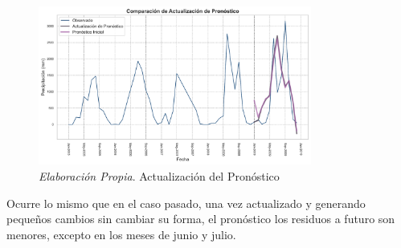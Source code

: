 \documentclass[12pt,letterpaper]{article}   %
\begin{document}
\begin{figure}[ht]
    \centering
    \includegraphics[width=0.8\textwidth]{imagenes/06-02-Actualizacion-de-pronostico.pdf}
    \caption{\textit{Elaboración Propia}. Actualización del Pronóstico}
\end{figure}

Ocurre lo mismo que en el caso pasado, una vez actualizado y generando pequeños cambios sin cambiar su forma, el pronóstico los residuos a futuro son menores, excepto en los meses de junio y julio.


\newpage
\end{document}
